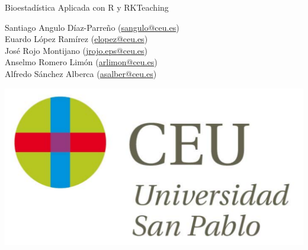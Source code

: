 \begin{titlepage}
\vspace*{5cm}
\par
\centering
\normalfont\fontsize{25}{25}\selectfont
Bioestadística Aplicada con R y RKTeaching%
\par  
\vspace*{3cm}
{\LARGE
\noindent
Santiago Angulo Díaz-Parreño (\url{sangulo@ceu.es})\\
Euardo López Ramírez (\url{elopez@ceu.es})\\
José Rojo Montijano (\url{jrojo.eps@ceu.es})\\
Anselmo Romero Limón (\url{arlimon@ceu.es})\\
Alfredo Sánchez Alberca (\url{asalber@ceu.es})
} \par %
\vfill
\includegraphics[scale=0.3]{img/logo_uspceu_01}
\end{titlepage}

